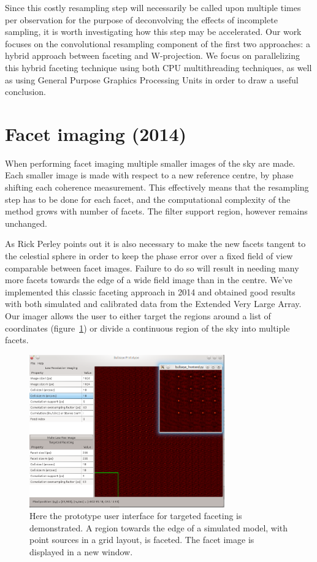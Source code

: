 \documentclass[a4paper,10pt]{article}
\begin{document}
Since this costly resampling step will necessarily be called upon multiple times per observation for the purpose of deconvolving the 
effects of incomplete sampling, it is worth investigating how this step may be accelerated. Our work focuses on the convolutional 
resampling component of the first two approaches: a hybrid approach between faceting and W-projection. We focus on parallelizing
this hybrid faceting technique using both CPU multithreading techniques, as well as using General Purpose Graphics 
Processing Units in order to draw a useful conclusion.
\section{Facet imaging (2014)}
When performing facet imaging multiple smaller images of the sky are made. Each smaller image is made with respect to a new reference
centre, by phase shifting each coherence measurement. This effectively means that the resampling step has to be done for each
facet, and the computational complexity of the method grows with number of facets. The filter support region, however remains unchanged.

As Rick Perley \cite{perley1999imaging} points out it is also necessary to make the new facets tangent to the celestial sphere in order 
to keep the phase error over a fixed field of view comparable between facet images. Failure to do so will result in needing many
more facets towards the edge of a wide field image than in the centre. We've implemented this classic faceting approach in 2014 and obtained
good results with both simulated and calibrated data from the Extended Very Large Array. Our imager allows the user to either target the 
regions around a list of coordinates (figure~\ref{FIG_BULLSEYE}) or divide a continuous region of the sky into multiple facets.

\begin{figure}[h!]
 \centering
 \includegraphics[width=0.75\textwidth]{images/targeted_faceting.png}
 \caption[Targeted faceting]{Here the prototype user interface for targeted faceting is demonstrated. A region towards the edge
 of a simulated model, with point sources in a grid layout, is faceted. The facet image is displayed in a new window.}
 \label{FIG_BULLSEYE}
\end{figure}
\end{document}
